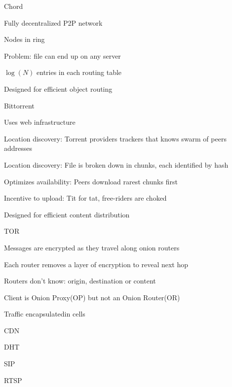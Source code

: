 \documentclass[main.tex]{subfiles}
\begin{document}
\begin{card}{Chord}
\item Fully decentralized P2P network
\item Nodes in ring
\item Problem: file can end up on any server
\item $\log(N)$ entries in each routing table
\item Designed for efficient object routing
\end{card}


\begin{card}{Bittorrent}
\item Uses web infrastructure
\item Location discovery: Torrent providers trackers that knows swarm of peers addresses
\item Location discovery: File is broken down in chunks, each identified by hash
\item Optimizes availability: Peers download rarest chunks first
\item Incentive to upload: Tit for tat, free-riders are choked
\item Designed for efficient content distribution
\end{card}


\begin{card}{TOR}
\item Messages are encrypted as they travel along onion routers
\item Each router removes a layer of encryption to reveal next hop
\item Routers don't know: origin, destination or content
\item Client is Onion Proxy(OP) but not an Onion Router(OR)
\item Traffic encapsulatedin cells
\end{card}

\begin{card}{CDN}
\TODO
\end{card}

\begin{card}{DHT}
\TODO
\end{card}

\begin{card}{SIP}
\TODO
\end{card}

\begin{card}{RTSP}
\TODO
\end{card}
\end{document}
